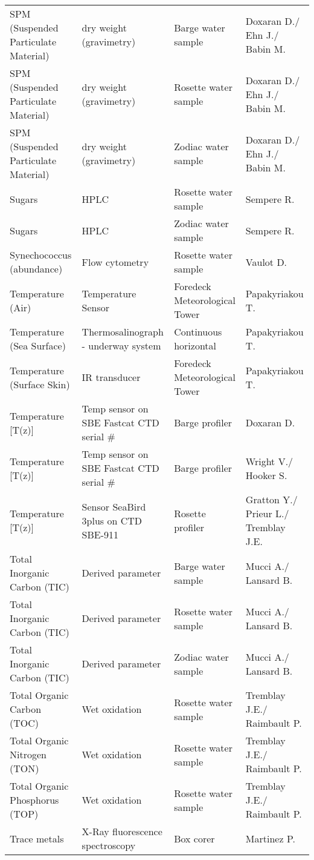\begin{landscape}
\begin{longtable}[t]{llll}
SPM (Suspended Particulate Material) & dry weight (gravimetry) & Barge water sample & Doxaran D./ Ehn J./ Babin M.\\
\addlinespace
SPM (Suspended Particulate Material) & dry weight (gravimetry) & Rosette water sample & Doxaran D./ Ehn J./ Babin M.\\
SPM (Suspended Particulate Material) & dry weight (gravimetry) & Zodiac water sample & Doxaran D./ Ehn J./ Babin M.\\
Sugars & HPLC & Rosette water sample & Sempere R.\\
Sugars & HPLC & Zodiac water sample & Sempere R.\\
Synechococcus (abundance) & Flow cytometry & Rosette water sample & Vaulot D.\\
\addlinespace
Temperature (Air) & Temperature Sensor & Foredeck Meteorological Tower & Papakyriakou T.\\
Temperature (Sea Surface) & Thermosalinograph - underway system & Continuous horizontal & Papakyriakou T.\\
Temperature (Surface Skin) & IR transducer & Foredeck Meteorological Tower & Papakyriakou T.\\
Temperature [T(z)] & Temp sensor on SBE Fastcat CTD serial \# & Barge profiler & Doxaran D.\\
Temperature [T(z)] & Temp sensor on SBE Fastcat CTD serial \# & Barge profiler & Wright V./ Hooker S.\\
\addlinespace
Temperature [T(z)] & Sensor SeaBird 3plus on CTD SBE-911 & Rosette profiler & Gratton Y./ Prieur L./ Tremblay J.E.\\
Total Inorganic Carbon (TIC) & Derived parameter & Barge water sample & Mucci A./ Lansard B.\\
Total Inorganic Carbon (TIC) & Derived parameter & Rosette water sample & Mucci A./ Lansard B.\\
Total Inorganic Carbon (TIC) & Derived parameter & Zodiac water sample & Mucci A./ Lansard B.\\
Total Organic Carbon (TOC) & Wet oxidation & Rosette water sample & Tremblay J.E./ Raimbault P.\\
\addlinespace
Total Organic Nitrogen (TON) & Wet oxidation & Rosette water sample & Tremblay J.E./ Raimbault P.\\
Total Organic Phosphorus (TOP) & Wet oxidation & Rosette water sample & Tremblay J.E./ Raimbault P.\\
Trace metals & X-Ray fluorescence spectroscopy & Box corer & Martinez P.\\

\end{longtable}
\end{landscape}
